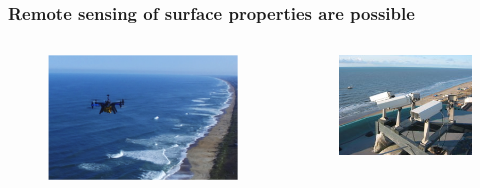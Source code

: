 \documentclass[7pt]{beamer}
\begin{document}
\begin{frame}
	\frametitle{Remote sensing of surface properties are possible}
	        \begin{columns}
				\begin{figure}[H]
					\centering
					\includegraphics[width=1\linewidth]{img/remoteSensingUAV.png}
				\end{figure}
			\begin{figure}[H]
				\centering
				\includegraphics[width=0.9\linewidth]{img/argus_camera.JPG}
			\end{figure}
		\end{columns}
\end{frame}
\end{document}
